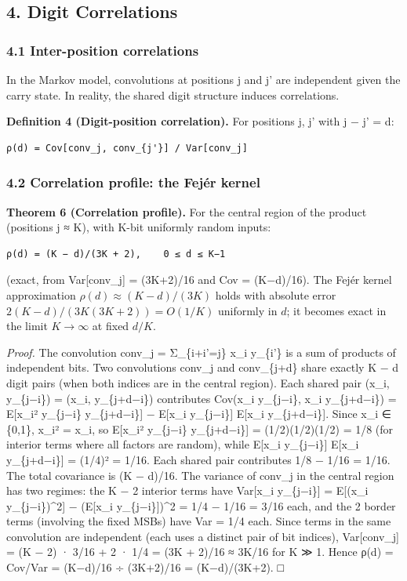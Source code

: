 \documentclass[
  11pt,
]{article}
\begin{document}
\subsection{4. Digit Correlations}\label{digit-correlations}

\subsubsection{4.1 Inter-position
correlations}\label{inter-position-correlations}

In the Markov model, convolutions at positions j and j' are independent given
the carry state. In reality, the shared digit structure induces correlations.

\textbf{Definition 4 (Digit-position correlation).} For positions j, j' with
\textbar j − j'\textbar{} = d:

\begin{verbatim}
ρ(d) = Cov[conv_j, conv_{j'}] / Var[conv_j]
\end{verbatim}

\subsubsection{4.2 Correlation profile: the Fejér
kernel}\label{correlation-profile-the-fejuxe9r-kernel}

\textbf{Theorem 6 (Correlation profile).} For the central region of the product
(positions j ≈ K), with K-bit uniformly random inputs:

\begin{verbatim}
ρ(d) = (K − d)/(3K + 2),    0 ≤ d ≤ K−1
\end{verbatim}

(exact, from Var{[}conv\_j{]} = (3K+2)/16 and Cov = (K−d)/16). The Fejér kernel
approximation \(\rho(d) \approx (K-d)/(3K)\) holds with absolute error
\(2(K-d)/(3K(3K+2)) = O(1/K)\) uniformly in \(d\); it becomes exact in the limit
\(K \to \infty\) at fixed \(d/K\).

\emph{Proof.} The convolution conv\_j = Σ\_\{i+i'=j\} x\_i y\_\{i'\} is a sum of
products of independent bits. Two convolutions conv\_j and conv\_\{j+d\} share
exactly K − d digit pairs (when both indices are in the central region). Each
shared pair (x\_i, y\_\{j−i\}) = (x\_i, y\_\{j+d−i\}) contributes Cov(x\_i
y\_\{j−i\}, x\_i y\_\{j+d−i\}) = E{[}x\_i² y\_\{j−i\} y\_\{j+d−i\}{]} − E{[}x\_i
y\_\{j−i\}{]} E{[}x\_i y\_\{j+d−i\}{]}. Since x\_i ∈ \{0,1\}, x\_i² = x\_i, so
E{[}x\_i² y\_\{j−i\} y\_\{j+d−i\}{]} = (1/2)(1/2)(1/2) = 1/8 (for interior terms
where all factors are random), while E{[}x\_i y\_\{j−i\}{]} E{[}x\_i
y\_\{j+d−i\}{]} = (1/4)² = 1/16. Each shared pair contributes 1/8 − 1/16 = 1/16.
The total covariance is (K − d)/16. The variance of conv\_j in the central
region has two regimes: the K − 2 interior terms have Var{[}x\_i y\_\{j−i\}{]} =
E{[}(x\_i y\_\{j−i\})\^{}2{]} − (E{[}x\_i y\_\{j−i\}{]})\^{}2 = 1/4 − 1/16 =
3/16 each, and the 2 border terms (involving the fixed MSBs) have Var = 1/4
each. Since terms in the same convolution are independent (each uses a distinct
pair of bit indices), Var{[}conv\_j{]} = (K − 2) · 3/16 + 2 · 1/4 = (3K + 2)/16
≈ 3K/16 for K ≫ 1. Hence ρ(d) = Cov/Var = (K−d)/16 ÷ (3K+2)/16 = (K−d)/(3K+2). □
\end{document}
